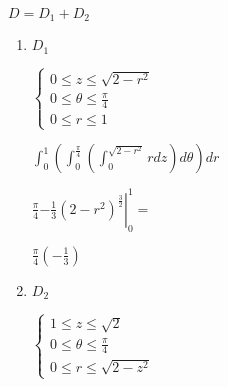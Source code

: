 \documentclass[../practica_09.tex]{subfiles}
\begin{document}
\begin{enumerate}
        $D=D_1 + D_2$

        \begin{enumerate}
            \item $D_1$
            
                $\left \{ \begin{array}{ll}
                    0 \leq z \leq \sqrt{2-r^2} \\
                    0 \leq \theta \leq \frac{\pi}{4} \\
                    0 \leq r \leq 1
                \end{array} \right.$

                $\int_0^1 (\int_0^{\frac{\pi}{4}} (\int_0^{\sqrt{2-r^2}} r dz ) d\theta) dr$

                $\frac{\pi}{4} \left. -\frac{1}{3}\left(2-r^2\right)^{\frac{3}{2}} \right |_0^1 = $

                $\frac{\pi}{4} (-\frac{1}{3}) $

            \item $D_2$

                $\left \{ \begin{array}{ll}
                    1 \leq z \leq \sqrt{2} \\
                    0 \leq \theta \leq \frac{\pi}{4} \\
                    0 \leq r \leq \sqrt{2-z^2}
                \end{array} \right.$

        \end{enumerate}

    \end{enumerate}
\end{document}
